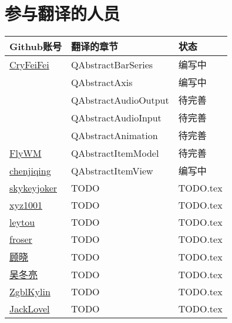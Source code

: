 \chapter{参与翻译的人员}


\centering
\begin{tabular}{lll}
	\toprule
	\cmidrule{1-3}
	 Github账号 & 翻译的章节 & 状态\\
	\midrule
	\href{https://github.com/CryFeiFei}{CryFeiFei} & QAbstractBarSeries & 编写中 \\
	 & QAbstractAxis & 编写中 \\
	 & QAbstractAudioOutput & 待完善  \\
	 & QAbstractAudioInput & 待完善  \\
	 & QAbstractAnimation & 待完善\\
	\href{https://github.com/FlyWM}{FlyWM}  & QAbstractItemModel & 待完善 \\
	\href{https://github.com/chenjiqing}{chenjiqing}  & QAbstractItemView & 编写中 \\	
	\href{https://github.com/skykeyjoker}{skykeyjoker}  & TODO & TODO.tex \\	
	\href{https://github.com/xyz1001}{xyz1001}  & TODO & TODO.tex \\	
	\href{https://github.com/leytou}{leytou}  & TODO & TODO.tex \\	
	\href{https://github.com/froser}{froser}  & TODO & TODO.tex \\	
	\href{https://github.com/chenyanzz}{顾晓}  & TODO & TODO.tex \\
    \href{https://github.com/abc881858}{吴冬亮}  & TODO & TODO.tex \\	
    \href{https://github.com/ZgblKylin}{ZgblKylin}  & TODO & TODO.tex \\	
	\href{https://github.com/JackLovel}{JackLovel}  & TODO & TODO.tex \\
	\bottomrule
\end{tabular}

